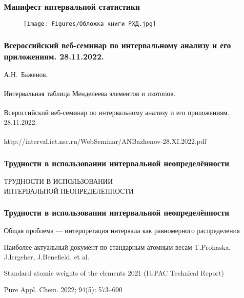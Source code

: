 \begin{frame}
	\frametitle{Манифест интервальной статистики}
	\begin{figure}[ht]
		\centering
		\texttt{[image: Figures/Обложка книги РХД.jpg]}
	\end{figure}
\end{frame}

\begin{frame}
	\frametitle{Всероссийский веб-семинар по интервальному анализу и его приложениям. 28.11.2022.}
А.Н.~Баженов.\\
~\\ 
Интервальная таблица Менделеева элементов и изотопов. \\
~\\ 
Всероссийский веб-семинар по интервальному анализу и его приложениям. 28.11.2022.\\
~\\
http://interval.ict.nsc.ru/WebSeminar/ANBazhenov-28.XI.2022.pdf
\end{frame}

\begin{frame}
	\frametitle{Трудности в использовании интервальной неопределённости}

\begin{center}	
ТРУДНОСТИ В ИСПОЛЬЗОВАНИИ \\ ИНТЕРВАЛЬНОЙ НЕОПРЕДЕЛЁННОСТИ
\end{center}	
	
\end{frame}


\begin{frame}
	\frametitle{Трудности в использовании интервальной неопределённости}
	
Общая проблема --- интерпретация интервала как равномерного распределения

\medskip
Наиболее актуальный документ по стандарным атомным весам
\medskip
T.Prohaska, J.Irrgeher, J.Benefield, et al. 

\medskip
Standard atomic weights of the elements 2021 (IUPAC Technical Report) 

Pure Appl. Chem. 2022; 94(5): 573–600

	
\end{frame}

